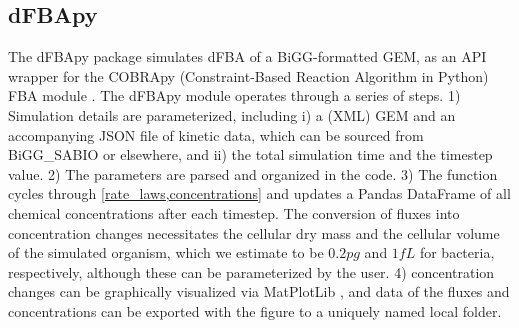 \subsection*{dFBApy}
The dFBApy package simulates dFBA of a BiGG-formatted GEM, as an API wrapper for the COBRApy (Constraint-Based Reaction Algorithm in Python) FBA module \cite{Schellenberger2011QuantitativeV2.0,Lloyd2018COBRAme:Expression}. The dFBApy module operates through a series of steps. 1) Simulation details are parameterized, including i) a (XML) GEM and an accompanying JSON file of kinetic data, which can be sourced from BiGG\_SABIO or elsewhere, and ii) the total simulation time and the timestep value. 2) The parameters are parsed and organized in the code. 3) The  function cycles through \cref{rate_laws,concentrations} and updates a Pandas DataFrame \cite{McKinney2011Pandas:Statistics} of all chemical concentrations after each timestep. The conversion of fluxes into concentration changes necessitates the cellular dry mass and the cellular volume of the simulated organism, which we estimate to be $0.2 pg$ \cite{Loferer-Krobacher1998DeterminationAnalysis} and $1 fL$ \cite{Lewis2014MassPopulations} for bacteria, respectively, although these can be parameterized by the user. 4) concentration changes can be graphically visualized via MatPlotLib \cite{Hunter2007Matplotlib:Environment}, and data of the fluxes and concentrations can be exported with the figure to a uniquely named local folder. 

